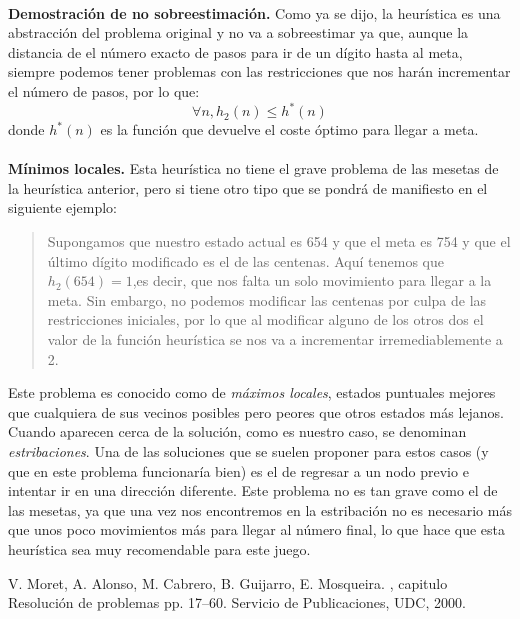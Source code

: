 \documentclass[12pt]{article}
\begin{document}
\paragraph{}
\textbf{Demostración de no sobreestimación.} Como ya se dijo, la heurística es una abstracción del problema original y no va a sobreestimar ya que, aunque la distancia de el número exacto de pasos para ir de un dígito hasta al meta, siempre podemos tener problemas con las restricciones que nos harán incrementar el número de pasos, por lo que:
$$\forall n,h_2(n)\leq h^*(n)$$
donde $h^*(n)$ es la función que devuelve el coste óptimo para llegar a meta.
\paragraph{}
\textbf{Mínimos locales.} Esta heurística no tiene el grave problema de las mesetas de la heurística anterior, pero si tiene otro tipo que se pondrá de manifiesto en el siguiente ejemplo:
\begin{quote}
Supongamos que nuestro estado actual es 654 y que el meta es 754 y que el último dígito modificado es el de las centenas. Aquí tenemos que $h_2(654)=1$,es decir, que nos falta un solo movimiento para llegar a la meta. Sin embargo, no podemos modificar las centenas por culpa de las restricciones iniciales, por lo que al modificar alguno de los otros dos el valor de la función heurística se nos va a incrementar irremediablemente a 2.
\end{quote}
Este problema es conocido como de \textit{máximos locales}, estados puntuales mejores que cualquiera de sus vecinos posibles pero peores que otros estados más lejanos. Cuando aparecen cerca de la solución, como es nuestro caso, se denominan \textit{estribaciones}. Una de las soluciones que se suelen proponer para estos casos (y que en este problema funcionaría bien) es el de regresar a un nodo previo e intentar ir en una dirección diferente. Este problema no es tan grave como el de las mesetas, ya que una vez nos encontremos en la estribación no es necesario más que unos poco movimientos más para llegar al número final, lo que hace que esta heurística sea muy recomendable para este juego.

\begin{thebibliography}{1}
V. Moret, A. Alonso, M. Cabrero, B. Guijarro, E. Mosqueira.
, capitulo Resolución de problemas pp. 
17--60. 
\newblock Servicio de Publicaciones, UDC, 2000.
\end{thebibliography}
\end{document}
